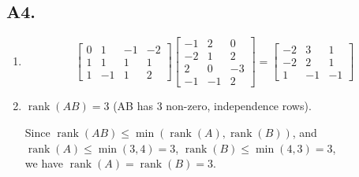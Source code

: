 \documentclass[fleqn]{article}
\begin{document}

\subsection*{A4.}
\begin{enumerate}[label=(\alph*)]
\item
\[
\begin{bmatrix} 0 & 1 & -1 & -2 \\ 1 & 1 & 1 & 1 \\ 1 & -1 & 1 & 2 \end{bmatrix}
\begin{bmatrix} -1 & 2 & 0 \\ -2 & 1 & 2 \\ 2 & 0 & -3 \\ -1 & -1 & 2 \end{bmatrix}
=
\begin{bmatrix} -2 & 3 & 1 \\ -2 & 2 & 1 \\ 1 & -1 & -1 \end{bmatrix}
\]

\item
$\operatorname{rank}(AB) = 3$ (AB has 3 non-zero, independence rows).

Since $\operatorname{rank}(AB) \leq \min(\operatorname{rank}(A), \operatorname{rank}(B))$,
and $\operatorname{rank}(A) \leq \min(3,4) = 3$, $\operatorname{rank}(B) \leq \min(4,3) = 3$, \\
we have $\operatorname{rank}(A) = \operatorname{rank}(B) = 3$.


\end{enumerate}
\end{document}

